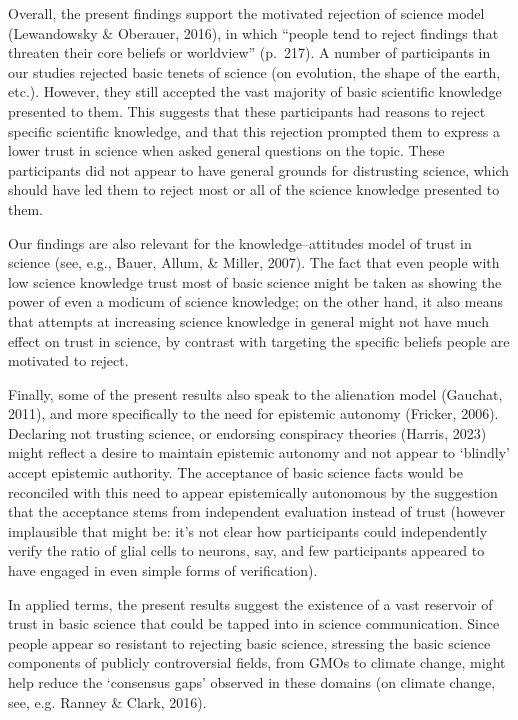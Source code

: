 \documentclass[
  doc,floatsintext]{apa6}
\begin{document}
Overall, the present findings support the motivated rejection of science model (Lewandowsky \& Oberauer, 2016), in which ``people tend to reject findings that threaten their core beliefs or worldview'' (p.~217). A number of participants in our studies rejected basic tenets of science (on evolution, the shape of the earth, etc.). However, they still accepted the vast majority of basic scientific knowledge presented to them. This suggests that these participants had reasons to reject specific scientific knowledge, and that this rejection prompted them to express a lower trust in science when asked general questions on the topic. These participants did not appear to have general grounds for distrusting science, which should have led them to reject most or all of the science knowledge presented to them.

Our findings are also relevant for the knowledge--attitudes model of trust in science (see, e.g., Bauer, Allum, \& Miller, 2007). The fact that even people with low science knowledge trust most of basic science might be taken as showing the power of even a modicum of science knowledge; on the other hand, it also means that attempts at increasing science knowledge in general might not have much effect on trust in science, by contrast with targeting the specific beliefs people are motivated to reject.

Finally, some of the present results also speak to the alienation model (Gauchat, 2011), and more specifically to the need for epistemic autonomy (Fricker, 2006). Declaring not trusting science, or endorsing conspiracy theories (Harris, 2023) might reflect a desire to maintain epistemic autonomy and not appear to `blindly' accept epistemic authority. The acceptance of basic science facts would be reconciled with this need to appear epistemically autonomous by the suggestion that the acceptance stems from independent evaluation instead of trust (however implausible that might be: it's not clear how participants could independently verify the ratio of glial cells to neurons, say, and few participants appeared to have engaged in even simple forms of verification).

In applied terms, the present results suggest the existence of a vast reservoir of trust in basic science that could be tapped into in science communication. Since people appear so resistant to rejecting basic science, stressing the basic science components of publicly controversial fields, from GMOs to climate change, might help reduce the `consensus gaps' observed in these domains (on climate change, see, e.g. Ranney \& Clark, 2016).
\end{document}
